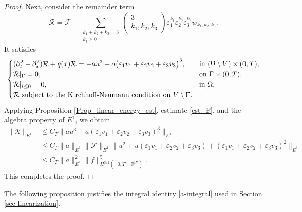 \documentclass[11pt]{amsart}
\theoremstyle{definition}
\theoremstyle{plain}
\numberwithin{equation}{section}
\begin{document}
\begin{proof}
Next, consider the remainder term
\begin{equation*}
    \mathcal{R}
    = \mathcal{F}
    - \sum_{\substack{k_1+k_2+k_3=3 \\ k_j \geq 0}}
    \begin{pmatrix} 3\\ k_1,k_2,k_3 \end{pmatrix}
    \varepsilon_1^{k_1}\varepsilon_2^{k_2}\varepsilon_3^{k_3}
    w_{k_1,k_2,k_3}.
\end{equation*}
It satisfies
\begin{equation}\label{eq_R}
\begin{cases}
(\partial_{t}^2 -\partial_x^2 ) \mathcal{R}+q(x)\mathcal{R}
= -au^3 + a\big(\varepsilon_1 v_1+\varepsilon_2 v_2+\varepsilon_3 v_3\big)^3, & \text{in }(\Omega\setminus V)\times (0,T),\\
\mathcal{R}\arrowvert_{\Gamma}=0, & \textrm{on }\Gamma\times(0,T),\\
\mathcal{R}\arrowvert_{t \leq 0}=0, & \textrm{in }\Omega, \\
\mathcal{R} \text{ subject to the Kirchhoff-Neumann condition on } V\setminus\Gamma.
\end{cases}
\end{equation}
Applying Proposition \ref{Prop_linear_energy_est}, estimate \eqref{est_F}, and the algebra property of $E^1$, we obtain
\begin{align}\label{arg_est_R}
    \nonumber\|\mathcal{R}\|_{E^1} 
    &\leq C_T \|au^3 + a(\varepsilon_1 v_1+\varepsilon_2 v_2+\varepsilon_3 v_3)^3\|_{E^1}\\
    &\leq C_T \|a\|_{E^1}\|\mathcal{F}\|_{E^1}
        \|u^2 + u(\varepsilon_1 v_1+\varepsilon_2 v_2+\varepsilon_3 v_3) + (\varepsilon_1 v_1+\varepsilon_2 v_2+\varepsilon_3 v_3)^2\|_{E^1}\\
    \nonumber&\leq C_T \|a\|_{E^1}^2 \|f\|_{H^{3/2}([0,T];\mathbb{R}^{|\Gamma|})}^5.
\end{align}
This completes the proof.
\end{proof}


The following proposition justifies the integral identity \eqref{a-integral} used in Section \ref{sec-linearization}.
\end{document}
